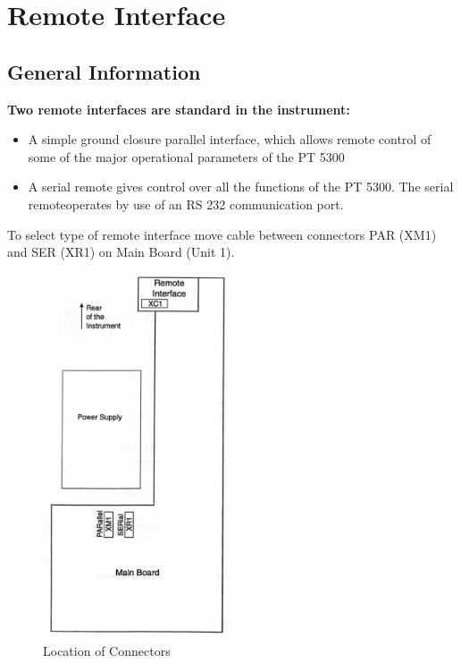 \section{Remote Interface}
\label{cha:Remote}
\subsection{ General Information}

\textbf{Two remote interfaces are standard in the instrument:}

\begin{itemize}
\item A simple ground closure parallel interface, which allows remote control of some of the major operational parameters of the PT 5300
\item A serial remote gives control over all the functions of the PT 5300. The serial remoteoperates by use of an RS 232 communication port. 
\end{itemize}

To select type of remote interface move cable between connectors PAR (XM1) and SER (XR1) on Main Board (Unit 1).

\begin{figure}[hbt]
\centering
\includegraphics[width=0.5\textwidth]{fig/pt5300_overview}
\caption{Location of Connectors}
\end{figure}

